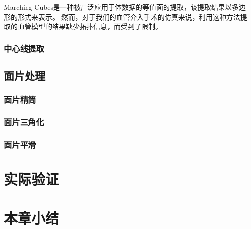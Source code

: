 Marching Cubes\cite{Lorensen1987MC}是一种被广泛应用于体数据的等值面的提取，该提取结果以多边形的形式来表示。
然而，对于我们的血管介入手术的仿真来说，利用这种方法提取的血管模型的结果缺少拓扑信息，而受到了限制\cite{Nowinski2001NeuroCath}\cite{Hahn1998GWU}。

\subsubsection{中心线提取}

\subsection{面片处理}

\subsubsection{面片精简}

\subsubsection{面片三角化}

\subsubsection{面片平滑}


\section{实际验证}

\section{本章小结} 